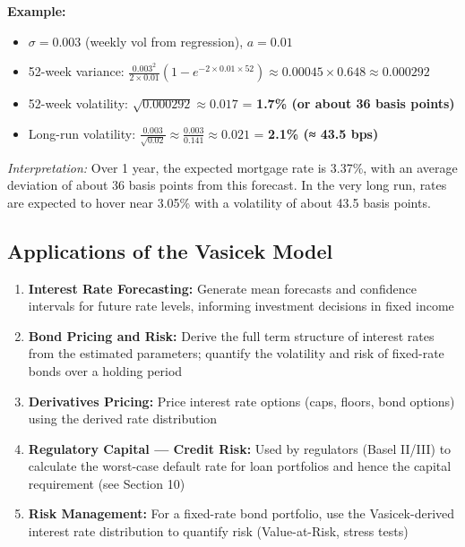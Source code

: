 \documentclass[12pt,openany]{book}
\theoremstyle{definition}
\theoremstyle{remark}
\begin{document}
\textbf{Example:}

\begin{itemize}
\item $\sigma = 0.003$ (weekly vol from regression), $a = 0.01$


\item 52-week variance: $\frac{0.003^2}{2 \times 0.01}(1 - e^{-2 \times 0.01 \times 52}) \approx 0.00045 \times 0.648 \approx 0.000292$


\item 52-week volatility: $\sqrt{0.000292} \approx 0.017$ = \textbf{1.7\% (or about 36 basis points)}


\item Long-run volatility: $\frac{0.003}{\sqrt{0.02}} \approx \frac{0.003}{0.141} \approx 0.021$ = \textbf{2.1\% (≈ 43.5 bps)}


\end{itemize}
\emph{Interpretation:} Over 1 year, the expected mortgage rate is 3.37\%, with an average deviation of about 36 basis points from this forecast. In the very long run, rates are expected to hover near 3.05\% with a volatility of about 43.5 basis points.

\medskip
\subsection{Applications of the Vasicek Model}
\begin{enumerate}
\item \textbf{Interest Rate Forecasting:} Generate mean forecasts and confidence intervals for future rate levels, informing investment decisions in fixed income


\item \textbf{Bond Pricing and Risk:} Derive the full term structure of interest rates from the estimated parameters; quantify the volatility and risk of fixed-rate bonds over a holding period


\item \textbf{Derivatives Pricing:} Price interest rate options (caps, floors, bond options) using the derived rate distribution


\item \textbf{Regulatory Capital --- Credit Risk:} Used by regulators (Basel II/III) to calculate the worst-case default rate for loan portfolios and hence the capital requirement (see Section 10)


\item \textbf{Risk Management:} For a fixed-rate bond portfolio, use the Vasicek-derived interest rate distribution to quantify risk (Value-at-Risk, stress tests)


\end{enumerate}
\medskip
\end{document}
